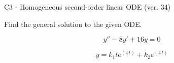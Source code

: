 \begin{exercise}
  \begin{exerciseTitle}C3 - Homogeneous second-order linear ODE (ver. 34)\end{exerciseTitle}
  \begin{exerciseStatement}
    
Find the general solution to the given ODE.

    
\[y''-8y'+16y = 0\]

  \end{exerciseStatement}
  \begin{exerciseAnswer}
    
\[y= k_{1} t e^{\left(4 \, t\right)} + k_{2} e^{\left(4 \, t\right)}\]

  \end{exerciseAnswer}
\end{exercise}